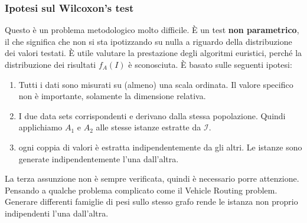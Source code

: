 \documentclass{article}
\begin{document}
\subsubsection{Ipotesi sul Wilcoxon's test}
Questo è un problema metodologico molto difficile. È un test \textbf{non parametrico}, il che
significa che non si sta ipotizzando su nulla a riguardo della distribuzione dei valori
testati. È utile valutare la prestazione degli algoritmi euristici, perché la distribuzione
dei risultati $f_A(I)$ è sconosciuta. È basato sulle seguenti ipotesi:
\begin{enumerate}
    \item Tutti i dati sono misurati su (almeno) una scala ordinata. Il valore specifico non
          è importante, solamente la dimensione relativa.

    \item I due data sets corrispondenti e derivano dalla stessa popolazione. Quindi applichiamo
          $A_1$ e $A_2$ alle stesse istanze estratte da $\mathcal{I}$.

    \item ogni coppia di valori è estratta indipendentemente da gli altri. Le istanze
          sono generate indipendentemente l'una dall'altra.
\end{enumerate}

La terza assunzione non è sempre verificata, quindi è necessario porre attenzione. Pensando
a qualche problema complicato come il Vehicle Routing problem. Generare differenti famiglie
di pesi sullo stesso grafo rende le istanza non proprio indipendenti l'una dall'altra.
\end{document}
